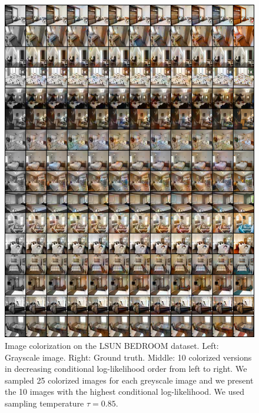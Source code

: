 \begin{figure}[h!]
    \centering
    \includegraphics[width=\textwidth]{Chapter1/paper_graphs/SupplementaryMaterial/colorization_lsun_0.85_2.png}
    \caption{Image colorization on the LSUN BEDROOM dataset. Left: Grayscale image. Right: Ground truth. Middle: 10 colorized versions in decreasing conditional log-likelihood order from left to right. We sampled 25 colorized images for each greyscale image and we present the 10 images with the highest conditional log-likelihood. We used sampling temperature $\tau=0.85$.}
\end{figure}

